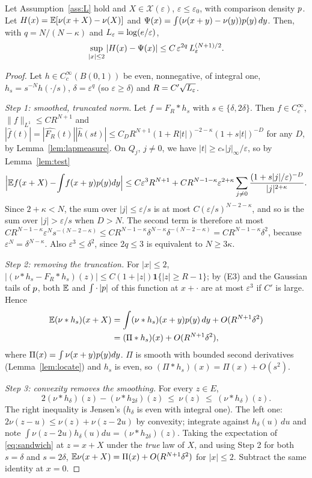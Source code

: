 \begin{proposition}\label{prop:value}
Let Assumption~\ref{ass:L} hold and $X\in\mathcal X(\varepsilon)$, $\varepsilon\le\varepsilon_0$, with comparison density
$p$. Let $H(x)=\mathbb{E}[\nu(x+X)-\nu(X)]$ and $\Psi(x)=\int(\nu(x+y)-\nu(y))p(y)\,dy$. Then, with
$q=N/(N-\kappa)$ and $L_\varepsilon=\log(e/\varepsilon)$,
\[
\sup_{|x|\le2}|H(x)-\Psi(x)|\le C\,\varepsilon^{2q}\,L_\varepsilon^{(N+1)/2}.
\]
\end{proposition}
\begin{proof}
Let $h\in C_c^\infty(B(0,1))$ be even, nonnegative, of integral one, $h_s=s^{-N}h(\cdot/s)$, $\delta=\varepsilon^q$
(so $\varepsilon\ge\delta$) and $R=C'\sqrt{L_\varepsilon}$.

\emph{Step 1: smoothed, truncated norm.} Let $f=F_R*h_s$ with $s\in\{\delta,2\delta\}$. Then $f\in C_c^\infty$,
$\|f\|_{L^1}\le CR^{N+1}$ and $|\widehat f(t)|=|\widehat{F_R}(t)||\widehat h(st)|\le C_DR^{N+1}(1+R|t|)^{-2-\kappa}(1+s|t|)^{-D}$
for any $D$, by Lemma~\ref{lem:lapmeasure}. On $Q_j$, $j\ne0$, we have $|t|\ge c_\ast|j|_\infty/\varepsilon$, so by
Lemma~\ref{lem:test}
\[
\Big|\mathbb{E} f(x+X)-\!\int\! f(x+y)p(y)dy\Big|\le C\varepsilon^3R^{N+1}+CR^{N-1-\kappa}\varepsilon^{2+\kappa}\sum_{j\ne0}\frac{(1+s|j|/\varepsilon)^{-D}}{|j|^{2+\kappa}}.
\]
Since $2+\kappa<N$, the sum over $|j|\le\varepsilon/s$ is at most $C(\varepsilon/s)^{N-2-\kappa}$, and so is the sum over
$|j|>\varepsilon/s$ when $D>N$. The second term is therefore at most
$CR^{N-1-\kappa}\varepsilon^{N}s^{-(N-2-\kappa)}\le CR^{N-1-\kappa}\delta^{N-\kappa}\delta^{-(N-2-\kappa)}=CR^{N-1-\kappa}\delta^2$,
because $\varepsilon^N=\delta^{N-\kappa}$. Also $\varepsilon^3\le\delta^2$, since $2q\le3$ is equivalent to $N\ge3\kappa$.

\emph{Step 2: removing the truncation.} For $|x|\le2$,
$|(\nu*h_s-F_R*h_s)(z)|\le C(1+|z|)\mathbf 1\{|z|\ge R-1\}$; by \textup{(E3)} and the Gaussian tails of $p$, both
$\mathbb{E}$ and $\int\cdot\,|p|$ of this function at $x+\cdot$ are at most $\varepsilon^3$ if $C'$ is large. Hence
\begin{align*}
\mathbb{E}(\nu*h_s)(x+X)&=\int(\nu*h_s)(x+y)p(y)\,dy+O(R^{N+1}\delta^2)\\&=(\Pi*h_s)(x)+O(R^{N+1}\delta^2),
\end{align*}
where $\Pi(x)=\int\nu(x+y)p(y)dy$. $\Pi$ is smooth with bounded second derivatives (Lemma~\ref{lem:locate}) and
$h_s$ is even, so $(\Pi*h_s)(x)=\Pi(x)+O(s^2)$.

\emph{Step 3: convexity removes the smoothing.} For every $z\in E$,
\begin{equation}\label{eq:sandwich}
2(\nu*h_\delta)(z)-(\nu*h_{2\delta})(z)\ \le\ \nu(z)\ \le\ (\nu*h_\delta)(z).
\end{equation}
The right inequality is Jensen's ($h_\delta$ is even with integral one). The left one: $2\nu(z-u)\le\nu(z)+\nu(z-2u)$
by convexity; integrate against $h_\delta(u)\,du$ and note $\int\nu(z-2u)h_\delta(u)du=(\nu*h_{2\delta})(z)$. Taking the
expectation of \eqref{eq:sandwich} at $z=x+X$ under the \emph{true} law of $X$, and using Step 2 for both
$s=\delta$ and $s=2\delta$,
$\mathbb{E}\nu(x+X)=\Pi(x)+O(R^{N+1}\delta^2)$ for $|x|\le2$. Subtract the same identity at $x=0$.
\end{proof}

